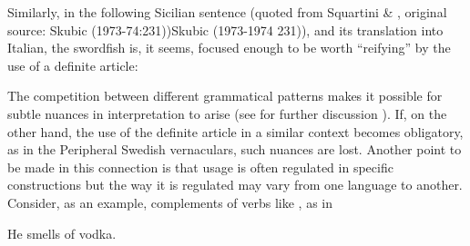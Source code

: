 Similarly, in the following Sicilian sentence (quoted from Squartini \& \citet[413]{Bertinetto2000}, original source: Skubic (1973-74:231))Skubic (1973-1974 231)), and its translation into Italian, the swordfish is, it seems, focused enough to be worth “reifying” by the use of a definite article:


\ea 
	\z	 
\z

The competition between different grammatical patterns makes it possible for subtle nuances in interpretation to arise (see for further discussion \citet[128-134]{Dahl2004}). If, on the other hand, the use of the definite article in a similar context becomes obligatory, as in the Peripheral Swedish vernaculars, such nuances are lost. Another point to be made in this connection is that usage is often regulated in specific constructions but the way it is regulated may vary from one language to another. Consider, as an example, complements of verbs like , as in


\ea
\gl He smells of vodka.  
 \z


